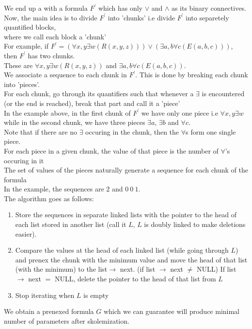 \documentclass{article}
\begin{document}
\begin{flushleft}
We end up a with a formula $F^{'}$ which has only $\vee$ and $\wedge$ as its binary connectives.\\
Now, the main idea is to divide $F^{'}$ into 'chunks' i.e divide $F^{'}$ into separetely quantified blocks,\\
where we call each block a 'chunk'\\
For example, if $F^{'}= (\forall x,y\exists w(R(x,y,z)))\vee (\exists a,b\forall c(E(a,b,c)))$, then $F^{'}$ has two chunks.\\
These are $\forall x,y\exists w(R(x,y,z))$ and $\exists a,b\forall c(E(a,b,c))$.\\
We associate a sequence to each chunk in $F^{'}$. This is done by breaking each chunk into 'pieces'.\\
For each chunk, go through its quantifiers such that whenever a $\exists$ is encountered (or the end is reached), break that part and call it a 'piece'\\
In the example above, in the first chunk of $F^{'}$ we have only one piece i.e $\forall x,y\exists w$\\
while in the second chunk, we have three pieces $\exists a$, $\exists b$ and $\forall c$.\\
Note that if there are no $\exists$ occuring in the chunk, then the $\forall$s form one single piece.\\
For each piece in a given chunk, the value of that piece is the number of $\forall$'s occuring in it\\
The set of values of the pieces naturally generate a sequence for each chunk of the formula\\
In the example, the sequences are $2$ and $0 \:0\:1$.\\
The algorithm goes as follows: \\
\begin{enumerate}
\item Store the sequences in separate linked lists with the pointer to the head of each list stored in another list (call it $L$, $L$ is doubly linked to make deletions easier).\\
\item Compare the values at the head of each linked list (while going through $L$) and prenex the chunk with the minimum value and move the head of that list (with the minimum) to the list$\rightarrow$ next. (if list $\rightarrow$ next $\neq$ NULL)
      If list $\rightarrow$ next $=$ NULL, delete the pointer to the head of that list from $L$
\item Stop iterating when $L$ is empty
\end{enumerate}
We obtain a prenexed formula $G$ which we can guarantee will produce minimal number of parameters after skolemization.\\
\end{flushleft}
\end{document}
